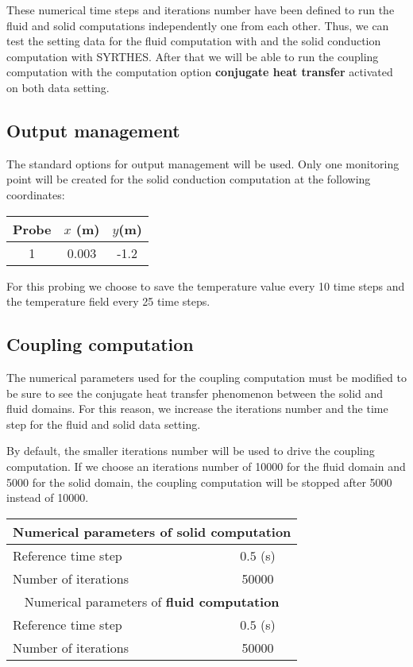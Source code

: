 These numerical time steps and iterations number have been defined to run the
fluid and solid computations independently one from each other.
Thus, we can test the setting data for the fluid computation with \CS and
 the solid conduction computation with SYRTHES.
After that we will be able to run the coupling computation with the computation
option {\bf conjugate heat transfer} activated on both data setting.

        \subsection{Output management}
The standard options for output management will be used. Only one monitoring point
will be created for the solid conduction computation at the following coordinates:

\begin{center}
\begin{tabular}{|c|c|c|}
\hline
Probe & $x$ (m) & $y$(m)    \\
\hline
1      & 0.003  & -1.2       \\
\hline
\end{tabular}
\end{center}

For this probing we choose to save the temperature value every 10 time steps and
the temperature field every 25 time steps.


        \subsection{Coupling computation}

The  numerical parameters used for the coupling computation must be modified to be sure
 to see the conjugate heat transfer phenomenon between the solid and fluid domains.
For this reason, we increase the iterations number and the time step for the fluid
and solid data setting.

By default, the smaller iterations number will be used to drive the coupling computation.
If we choose an iterations number of 10000 for the fluid domain and 5000 for the solid
domain, the coupling computation will be stopped after 5000 instead of 10000.

\begin{center}
\begin{tabular}{|l|c|}
\hline
\multicolumn{2}{|c|}{ Numerical parameters of {\bf solid computation}} \\
\hline
Reference time step  & $0.5$ (s) \\
\hline
Number of iterations & 50000 \\
\hline
\hline
\multicolumn{2}{|c|}{ Numerical parameters of {\bf fluid computation}} \\
\hline
Reference time step  & $0.5$ (s) \\
\hline
Number of iterations & 50000 \\
\hline
\end{tabular}\\
\end{center}

